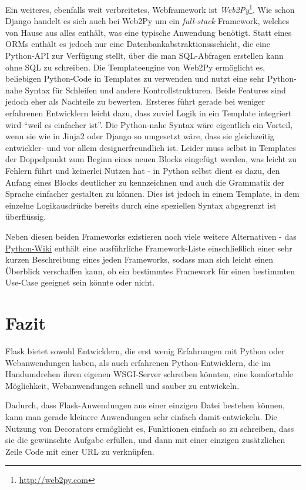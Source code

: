 Ein weiteres, ebenfalls weit verbreitetes, Webframework ist
\emph{Web2Py}\footnote{\href{http://web2py.com}{http://web2py.com}}. Wie schon Django handelt es
sich auch bei Web2Py um ein \emph{full-stack} Framework, welches von Hause aus alles enthält, was
eine typische Anwendung benötigt. Statt eines ORMs enthält es jedoch nur eine
Datenbankabstraktionssschicht, die eine Python-API zur Verfügung stellt, über die man SQL-Abfragen
erstellen kann ohne SQL zu schreiben. Die Templateengine von Web2Py ermöglicht es, beliebigen
Python-Code in Templates zu verwenden und nutzt eine sehr Python-nahe Syntax für Schleifen und
andere Kontrollstrukturen. Beide Features sind jedoch eher als Nachteile zu bewerten. Ersteres führt
gerade bei weniger erfahrenen Entwicklern leicht dazu, dass zuviel Logik in ein Template integriert
wird \enquote{weil es einfacher ist}. Die Python-nahe Syntax wäre eigentlich ein Vorteil, wenn sie
wie in Jinja2 oder Django so umgesetzt wäre, dass sie gleichzeitig entwickler- und vor allem
designerfreundlich ist. Leider muss selbst in Templates der Doppelpunkt zum Beginn eines neuen
Blocks eingefügt werden, was leicht zu Fehlern führt und keinerlei Nutzen hat - in Python selbst
dient es dazu, den Anfang eines Blocks deutlicher zu kennzeichnen und auch die Grammatik der Sprache
einfacher gestalten zu können. Dies ist jedoch in einem Template, in dem einzelne Logikausdrücke
bereits durch eine speziellen Syntax abgegrenzt ist überflüssig.

Neben diesen beiden Frameworks existieren noch viele weitere Alternativen - das
\href{http://wiki.python.org/moin/WebFrameworks}{Python-Wiki} enthält eine ausführliche
Framework-Liste einschließlich einer sehr kurzen Beschreibung eines jeden Frameworks, sodass man
sich leicht einen Überblick verschaffen kann, ob ein bestimmtes Framework für einen bestimmten
Use-Case geeignet sein könnte oder nicht.

\section{Fazit}
Flask bietet sowohl Entwicklern, die erst wenig Erfahrungen mit Python oder Webanwendungen haben,
als auch erfahrenen Python-Entwicklern, die im Handumdrehen ihren eigenen WSGI-Server schreiben
könnten, eine komfortable Möglichkeit, Webanwendungen schnell und sauber zu entwickeln.

Dadurch, dass Flask-Anwendungen aus einer einzigen Datei bestehen können, kann man gerade kleinere
Anwendungen sehr einfach damit entwickeln. Die Nutzung von Decorators ermöglicht es, Funktionen
einfach so zu schreiben, dass sie die gewünschte Aufgabe erfüllen, und dann mit einer einzigen
zusätzlichen Zeile Code mit einer URL zu verknüpfen.

